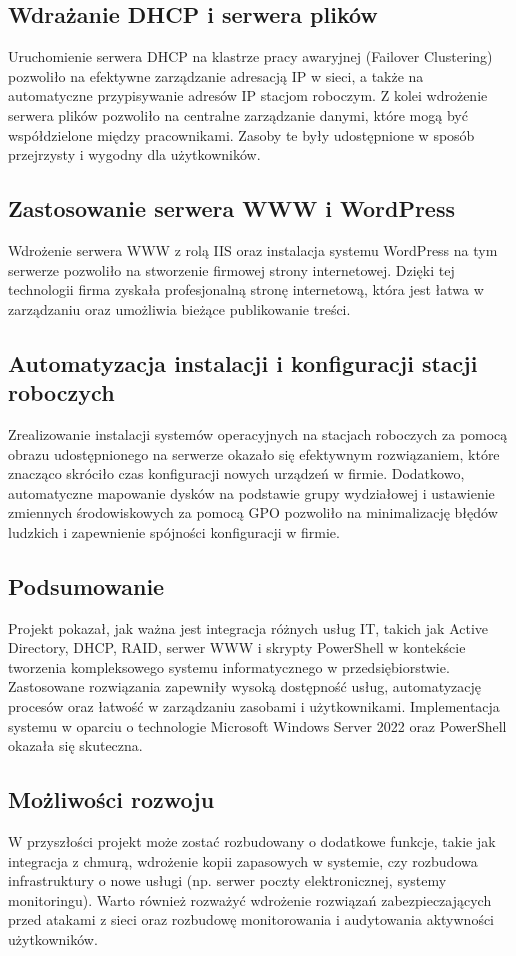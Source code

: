 \subsection{Wdrażanie DHCP i serwera plików}
Uruchomienie serwera DHCP na klastrze pracy awaryjnej (Failover Clustering) pozwoliło na efektywne zarządzanie adresacją IP w sieci, a także na automatyczne przypisywanie adresów IP stacjom roboczym. Z kolei wdrożenie serwera plików pozwoliło na centralne zarządzanie danymi, które mogą być współdzielone między pracownikami. Zasoby te były udostępnione w sposób przejrzysty i wygodny dla użytkowników.

\subsection{Zastosowanie serwera WWW i WordPress}
Wdrożenie serwera WWW z rolą IIS oraz instalacja systemu WordPress na tym serwerze pozwoliło na stworzenie firmowej strony internetowej. Dzięki tej technologii firma zyskała profesjonalną stronę internetową, która jest łatwa w zarządzaniu oraz umożliwia bieżące publikowanie treści.

\subsection{Automatyzacja instalacji i konfiguracji stacji roboczych}
Zrealizowanie instalacji systemów operacyjnych na stacjach roboczych za pomocą obrazu udostępnionego na serwerze okazało się efektywnym rozwiązaniem, które znacząco skróciło czas konfiguracji nowych urządzeń w firmie. Dodatkowo, automatyczne mapowanie dysków na podstawie grupy wydziałowej i ustawienie zmiennych środowiskowych za pomocą GPO pozwoliło na minimalizację błędów ludzkich i zapewnienie spójności konfiguracji w firmie.

\subsection{Podsumowanie}
Projekt pokazał, jak ważna jest integracja różnych usług IT, takich jak Active Directory, DHCP, RAID, serwer WWW i skrypty PowerShell w kontekście tworzenia kompleksowego systemu informatycznego w przedsiębiorstwie. Zastosowane rozwiązania zapewniły wysoką dostępność usług, automatyzację procesów oraz łatwość w zarządzaniu zasobami i użytkownikami. Implementacja systemu w oparciu o technologie Microsoft Windows Server 2022 oraz PowerShell okazała się skuteczna.

\subsection{Możliwości rozwoju}
W przyszłości projekt może zostać rozbudowany o dodatkowe funkcje, takie jak integracja z chmurą, wdrożenie kopii zapasowych w systemie, czy rozbudowa infrastruktury o nowe usługi (np. serwer poczty elektronicznej, systemy monitoringu). Warto również rozważyć wdrożenie rozwiązań zabezpieczających przed atakami z sieci oraz rozbudowę monitorowania i audytowania aktywności użytkowników.
